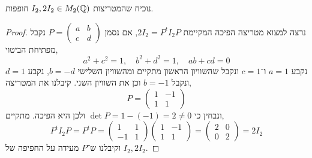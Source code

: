 \question{}
נוכיח שהמטריצות $I_2, 2I_2 \in M_2(\mathbb{Q})$ חופפות.
\begin{proof}
	נרצה למצוא מטריצה הפיכה המקיימת $2I_2 = P^t I_2 P$, אם נסמן $P = (\begin{smallmatrix} a & b \\ c & d \end{smallmatrix})$ נקבל מפתיחת הביטוי,
	\[
		a^2 + c^2 = 1,
		\quad
		b^2 + d^2 = 1,
		\quad
		ab + cd = 0
	\]
	נקבע $a = 1$ ו־$c = 1$ ונקבל שהשוויון הראשון מתקיים ומהשוויון השלישי $b = -d$, נקבע $d = 1$ ונקבל $b = -1$ וכן את השוויון השני.
	קיבלנו את המטריצה,
	\[
		P
		= \begin{pmatrix}
			1 & -1 \\
			1 & 1
		\end{pmatrix}
	\]
	ונבחין כי $\det P = 1 - (-1) = 2 \ne 0$ ולכן היא הפיכה.
	מתקיים,
	\[
		P^t I_2 P
		= P^t P
		= \begin{pmatrix}
			1 & 1 \\
			-1 & 1
		\end{pmatrix}
		\begin{pmatrix}
			1 & -1 \\
			1 & 1
		\end{pmatrix}
		= \begin{pmatrix}
			2 & 0 \\
			0 & 2
		\end{pmatrix}
		= 2 I_2
	\]
	וקיבלנו ש־$P$ מעידה על החפיפה של $I_2, 2I_2$.
\end{proof}


